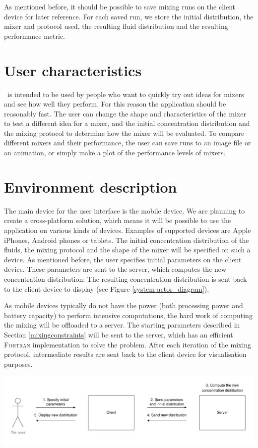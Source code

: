 As mentioned before, it should be possible to save mixing runs on the client device for later reference. For each saved run, we store the initial distribution, the mixer and protocol used, the resulting fluid distribution and the resulting performance metric.

\section{User characteristics}
\projectname\ is intended to be used by people who want to quickly try out ideas for mixers and see how well they perform. For this reason the application should be reasonably fast. The user can change the shape and characteristics of the mixer to test a different idea for a mixer, and the initial concentration distribution and the mixing protocol to determine how the mixer will be evaluated. To compare different mixers and their performance, the user can save runs to an image file or an animation, or simply make a plot of the performance levels of mixers.

\section{Environment description}
The main device for the user interface is the mobile device. We are planning to create a cross-platform solution, which means it will be possible to use the application on various kinds of devices. Examples of supported devices are Apple iPhones, Android phones or tablets. The initial concentration distribution of the fluids, the mixing protocol and the shape of the mixer will be specified on such a device. As mentioned before, the user specifies initial parameters on the client device. These parameters are sent to the server, which computes the new concentration distribution. The resulting concentration distribution is sent back to the client device to display (see Figure \ref{system-actor_diagram}).

As mobile devices typically do not have the power (both processing power and battery capacity) to perform intensive computations, the hard work of computing the mixing will be offloaded to a server. The starting parameters described in Section \ref{mixingconstraints} will be sent to the server, which has an efficient \textsc{Fortran} implementation to solve the problem. After each iteration of the mixing protocol, intermediate results are sent back to the client device for visualisation purposes.

\includegraphics[width=\textwidth]{system-actor_diagram}


